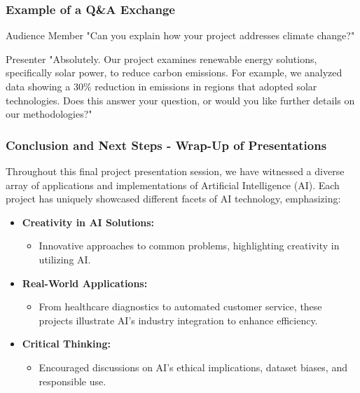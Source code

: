 \documentclass{beamer}
\begin{document}
\begin{frame}[fragile]
    \frametitle{Example of a Q\&A Exchange}
    \begin{block}{Audience Member}
        "Can you explain how your project addresses climate change?"
    \end{block}
    \begin{block}{Presenter}
        "Absolutely. Our project examines renewable energy solutions, specifically solar power, to reduce carbon emissions. For example, we analyzed data showing a 30\% reduction in emissions in regions that adopted solar technologies. Does this answer your question, or would you like further details on our methodologies?"
    \end{block}
\end{frame}

\begin{frame}[fragile]
    \frametitle{Conclusion and Next Steps - Wrap-Up of Presentations}
    Throughout this final project presentation session, we have witnessed a diverse array of applications and implementations of Artificial Intelligence (AI). Each project has uniquely showcased different facets of AI technology, emphasizing:
    \begin{itemize}
        \item \textbf{Creativity in AI Solutions:}
        \begin{itemize}
            \item Innovative approaches to common problems, highlighting creativity in utilizing AI.
        \end{itemize}
        
        \item \textbf{Real-World Applications:}
        \begin{itemize}
            \item From healthcare diagnostics to automated customer service, these projects illustrate AI's industry integration to enhance efficiency.
        \end{itemize}
        
        \item \textbf{Critical Thinking:}
        \begin{itemize}
            \item Encouraged discussions on AI's ethical implications, dataset biases, and responsible use.
        \end{itemize}
    \end{itemize}
\end{frame}
\end{document}
